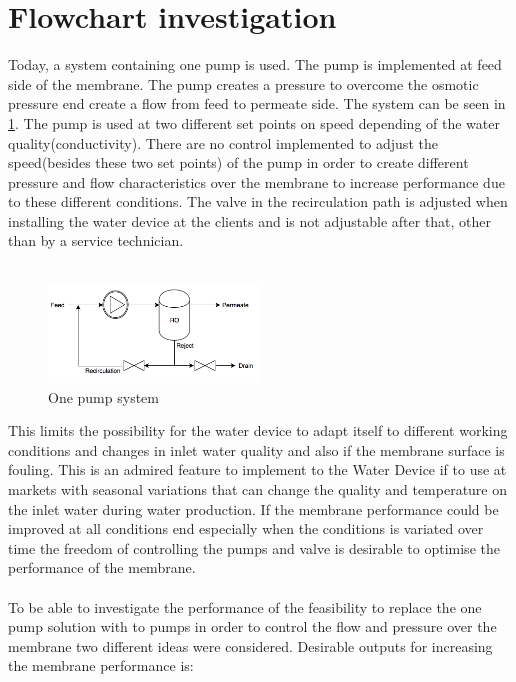 \section{Flowchart investigation}
\label{Flowchart}
Today, a system containing one pump is used. The pump is implemented at feed side of the membrane. The pump creates a pressure to overcome the osmotic pressure end create a flow from feed to permeate side. The system can be seen in \ref{fig:System11}. The pump is used at two different set points on speed depending of the water quality(conductivity). There are no control implemented to adjust the speed(besides these two set points) of the pump in order to create different pressure and flow characteristics over the membrane to increase performance due to these different conditions. The valve in the recirculation path is adjusted when installing the water device at the clients and is not adjustable after that, other than by a service technician.\\
\\
\begin{figure}[h]
    \centering
    \includegraphics[width=0.5\textwidth]{Sys1}
    \caption{One pump system}
    \label{fig:System11}
\end{figure}
This limits the possibility for the water device to adapt itself to different working conditions and changes in inlet water quality and also if the membrane surface is fouling. This is an admired feature to implement to the Water Device if to use at markets with seasonal variations that can change the quality and temperature on the inlet water during water production. If the membrane performance could be improved at all conditions end especially when the conditions is variated over time the freedom of controlling the pumps and valve is desirable to optimise the performance of the membrane. \\
\\
To be able to investigate the performance of the feasibility to replace the one pump solution with to pumps in order to control the flow and pressure over the membrane two different ideas were considered. Desirable outputs for increasing the membrane performance is:\\
